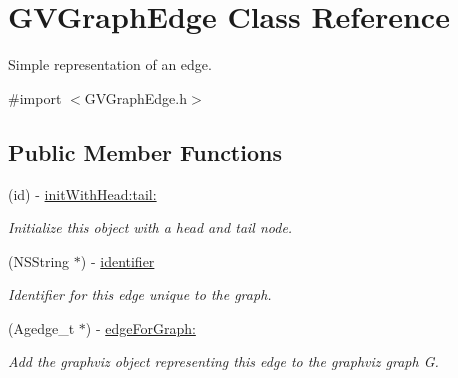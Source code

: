 \hypertarget{interface_g_v_graph_edge}{
\section{GVGraphEdge Class Reference}
\label{interface_g_v_graph_edge}
}


Simple representation of an edge.  




{\ttfamily \#import $<$GVGraphEdge.h$>$}

\subsection*{Public Member Functions}
\begin{DoxyCompactItemize}
\item 
\hypertarget{interface_g_v_graph_edge_a1badc7ce1edd0cf9333f5d17291ae13f}{
(id) -\/ \hyperlink{interface_g_v_graph_edge_a1badc7ce1edd0cf9333f5d17291ae13f}{initWithHead:tail:}}
\label{interface_g_v_graph_edge_a1badc7ce1edd0cf9333f5d17291ae13f}

\begin{DoxyCompactList}\small\item\em Initialize this object with a head and tail node. \end{DoxyCompactList}\item 
\hypertarget{interface_g_v_graph_edge_ad41f84a2d0000bb0a80fdb21f5e426bb}{
(NSString $\ast$) -\/ \hyperlink{interface_g_v_graph_edge_ad41f84a2d0000bb0a80fdb21f5e426bb}{identifier}}
\label{interface_g_v_graph_edge_ad41f84a2d0000bb0a80fdb21f5e426bb}

\begin{DoxyCompactList}\small\item\em Identifier for this edge unique to the graph. \end{DoxyCompactList}\item 
\hypertarget{interface_g_v_graph_edge_a4d10c8d6f7c49f3dfa0b54347f9c5427}{
(Agedge\_\-t $\ast$) -\/ \hyperlink{interface_g_v_graph_edge_a4d10c8d6f7c49f3dfa0b54347f9c5427}{edgeForGraph:}}
\label{interface_g_v_graph_edge_a4d10c8d6f7c49f3dfa0b54347f9c5427}

\begin{DoxyCompactList}\small\item\em Add the graphviz object representing this edge to the graphviz graph G. \end{DoxyCompactList}\end{DoxyCompactItemize}

